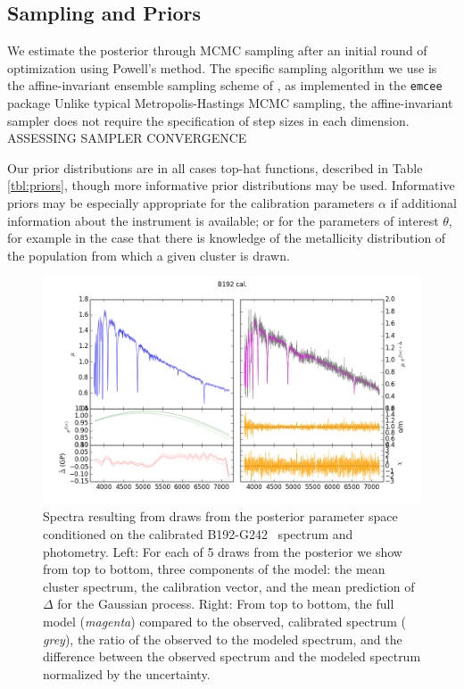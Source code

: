 \documentclass[iop,numberedappendix]{emulateapj}
\newcommand{\excluster}{B192-G242}
\begin{document}
\subsection{Sampling and Priors}

We estimate the posterior through MCMC sampling after an initial round
of optimization using Powell's method.  The specific sampling
algorithm we use is the affine-invariant ensemble sampling scheme of
\citet{goodman}, as implemented in the \texttt{emcee} package \citep{emcee}
Unlike typical Metropolis-Hastings MCMC sampling, the affine-invariant
sampler does not require the specification of step sizes in each
dimension.  {\color{blue}ASSESSING SAMPLER CONVERGENCE}
 
Our prior distributions are in all cases top-hat functions, described
in Table \ref{tbl:priors}, though more informative prior distributions
may be used.  Informative priors may be especially appropriate for the
calibration parameters $\alpha$ if additional information about the
instrument is available; or for the parameters of interest $\theta$,
for example in the case that there is knowledge of the metallicity
distribution of the population from which a given cluster is drawn.



\begin{figure}[h!]
\includegraphics[width=\textwidth]{figures/sfig_b192-g242_225_cal.png}
\caption{Spectra resulting from draws from the posterior parameter
space conditioned on the calibrated \excluster~ spectrum and
photometry.  Left: For each of 5 draws from the posterior we show from
top to bottom, three components of the model: the mean cluster
spectrum, the calibration vector, and the mean prediction of $\Delta$
for the Gaussian process.  Right: From top to bottom, the full model
({\it magenta}) compared to the observed, calibrated spectrum ({\it
grey}), the ratio of the observed to the modeled spectrum, and the
difference between the observed spectrum and the modeled spectrum
normalized by the uncertainty.
\label{fig:inferred_spectrum}}
\end{figure}
\end{document}

